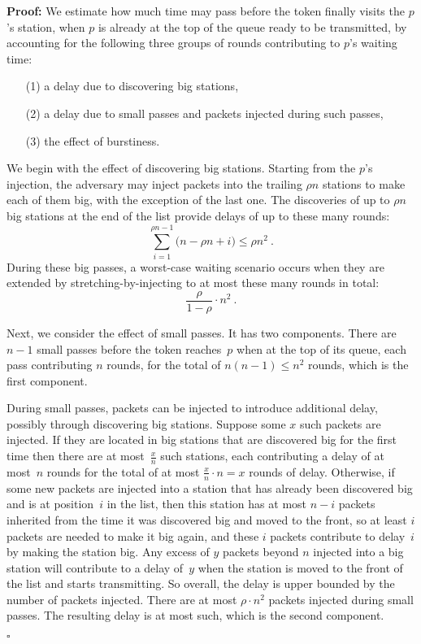 \documentclass[11pt]{article}
\newcommand{\qed}{\hfill $\square$}
\newenvironment{proof}{\noindent\textbf{Proof: }}{\qed \smallbreak}
\begin{document}
\begin{proof}
We estimate how much time may pass before the token finally visits the $p$'s station, when $p$ is already  at the top of the queue ready to be transmitted, by accounting for the following three groups of rounds contributing to $p$'s waiting time: 
\begin{enumerate}
\item[(1)] a delay due to discovering big stations, 

\item[(2)] a delay due to small passes and packets injected during such passes, 

\item[(3)] the effect of burstiness.
\end{enumerate}
We begin with the effect of discovering big stations.
Starting from the $p$'s injection, the adversary may inject packets into the trailing $\rho n$ stations to make each of them big, with the exception of the last one.
The discoveries of up to $\rho  n$ big stations at the end of the list provide delays of up to these many rounds:
\[
\sum_{i=1}^{\rho n-1} \bigl(n-\rho n+i\bigr)
\le
\rho n^2 
\ .
\]
During these big passes, a worst-case waiting scenario occurs when they are extended by stretching-by-injecting to at most these many rounds in total:
\[
\frac{\rho }{1-\rho} \cdot n^2
\ .
\]

Next, we consider the effect of small passes.
It has two components.
There are $n-1$  small passes before the token reaches~$p$ when at the top of its queue, each pass contributing $n$ rounds, for the total of $n(n-1)\le n^2$ rounds, which is the first component.

During small passes,  packets can be injected to introduce additional delay, possibly through discovering big stations.
Suppose some $x$ such packets are injected.
If they are located in big stations that are discovered big for the first time then there are at most~$\frac{x}{n}$ such stations, each contributing a delay of at most~$n$ rounds for the total of at most $\frac{x}{n}\cdot n=x$ rounds of delay.
Otherwise, if some new packets are injected into a station that has already been discovered big and is at position~$i$ in the list, then this station has at most $n-i$ packets inherited from the time it was discovered big and moved to the front, so at least $i$ packets are needed to make it big again,  and these $i$ packets contribute to delay~$i$ by making the station big.
Any excess of $y$ packets beyond $n$ injected into a big station will contribute to a delay of~$y$ when the station is moved to the front of the list and starts transmitting.
So overall, the delay is upper bounded by the number of packets injected.
There are at most $\rho\cdot n^2$ packets injected during small passes.
The resulting delay is at most such, which is the second component.


\end{proof}
\end{document}
